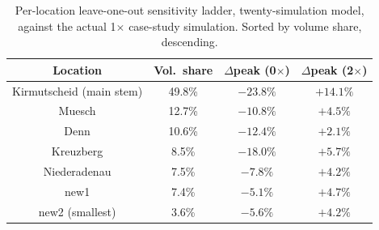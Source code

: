 \documentclass[12pt,a4paper]{report}
\begin{document}
{\begin{table}[H]
  \centering
  \caption{Per-location leave-one-out sensitivity ladder, twenty-simulation model, against the actual 1$\times$ case-study simulation.
    Sorted by volume share, descending.}
  \label{tab:twentysim-ladder}
  \begin{tabular}{cccc}
    \toprule
    Location & Vol.\ share & $\Delta$peak (0$\times$) & $\Delta$peak (2$\times$) \\
    \midrule
    Kirmutscheid (main stem) & 49.8\% & $-23.8\%$ & $+14.1\%$ \\
    Muesch                   & 12.7\% & $-10.8\%$ & $+4.5\%$ \\
    Denn                     & 10.6\% & $-12.4\%$ & $+2.1\%$ \\
    Kreuzberg                & 8.5\%  & $-18.0\%$ & $+5.7\%$  \\
    Niederadenau              & 7.5\%  & $-7.8\%$  & $+4.2\%$\\
    new1                     & 7.4\%  & $-5.1\%$  & $+4.7\%$ \\
    new2 (smallest)          & 3.6\%  & $-5.6\%$  & $+4.2\%$ \\
    \bottomrule
  \end{tabular}
\end{table}
 
 
\begin{table}[H]
  \centering
  \caption{Non-uniform BC sensitivity test, twenty-simulation model, each scenario against its own dedicated SFINCS ground truth. Same
    scenario definitions as Table~\ref{tab:foursim-blockbc}.}
  \label{tab:twentysim-blockbc}
\end{table}
 
}
\end{document}

